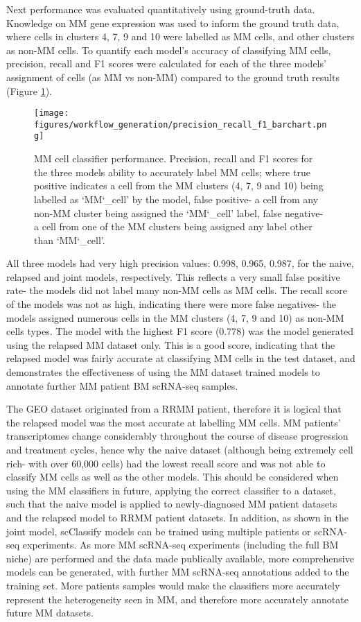 Next performance was evaluated quantitatively using ground-truth data.
Knowledge on MM gene expression was used to inform the ground truth data, where cells in clusters 4, 7, 9 and 10 were labelled as MM cells, and other clusters as non-MM cells.
To quantify each model's accuracy of classifying MM cells, precision, recall and F1 scores were calculated for each of the three models' assignment of cells (as MM vs non-MM) compared to the ground truth results (Figure \ref{fig:mm_class_accuracy_bar}).
%
\begin{figure}[htb]
\centering
\texttt{[image: figures/workflow\_generation/precision\_recall\_f1\_barchart.png]}
\caption[MM classifier accuracy]{MM cell classifier performance.
Precision, recall and F1 scores for the three models ability to accurately label MM cells; where true positive indicates a cell from the MM clusters (4, 7, 9 and 10) being labelled as `MM\char`_cell' by the model, false positive- a cell from any non-MM cluster being assigned the `MM\char`_cell' label, false negative- a cell from one of the MM clusters being assigned any label other than `MM\char`_cell'.
}
\label{fig:mm_class_accuracy_bar}
\end{figure}
%
All three models had very high precision values: 0.998, 0.965, 0.987, for the naive, relapsed and joint models, respectively.
This reflects a very small false positive rate- the models did not label many non-MM cells as MM cells.
The recall score of the models was not as high, indicating there were more false negatives- the models assigned numerous cells in the MM clusters (4, 7, 9 and 10) as non-MM cells types.
The model with the highest F1 score (0.778) was the model generated using the relapsed MM dataset only.
This is a good score, indicating that the relapsed model was fairly accurate at classifying MM cells in the test dataset, and demonstrates the effectiveness of using the MM dataset trained models to annotate further MM patient BM scRNA-seq samples.

The GEO dataset originated from a RRMM patient, therefore it is logical that the relapsed model was the most accurate at labelling MM cells.
MM patients' transcriptomes change considerably throughout the course of disease progression and treatment cycles, hence why the naive dataset (although being extremely cell rich- with over 60,000 cells) had the lowest recall score and was not able to classify MM cells as well as the other models.
This should be considered when using the MM classifiers in future, applying the correct classifier to a dataset, such that the naive model is applied to newly-diagnosed MM patient datasets and the relapsed model to RRMM patient datasets.
In addition, as shown in the joint model, scClassify models can be trained using multiple patients or scRNA-seq experiments.
As more MM scRNA-seq experiments (including the full BM niche) are performed and the data made publically available, more comprehensive models can be generated, with further MM scRNA-seq annotations added to the training set.
More patients samples would make the classifiers more accurately represent the heterogeneity seen in MM, and therefore more accurately annotate future MM datasets.


